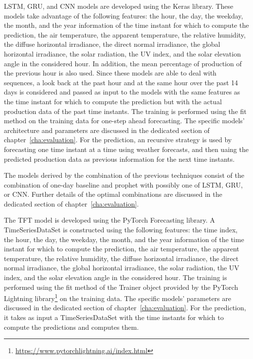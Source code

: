LSTM, GRU, and CNN models are developed using the Keras library.
These models take advantage of the following features: the hour, the day, the weekday, the month, and the year information of the time instant for which to compute the prediction, the air temperature, the apparent temperature, the relative humidity, the diffuse horizontal irradiance, the direct normal irradiance, the global horizontal irradiance, the solar radiation, the UV index, and the solar elevation angle in the considered hour.
In addition, the mean percentage of production of the previous hour is also used.
Since these models are able to deal with sequences, a look back at the past hour and at the same hour over the past 14 days is considered and passed as input to the models with the same features as the time instant for which to compute the prediction but with the actual production data of the past time instants.
The training is performed using the fit method on the training data for one-step ahead forecasting.
The specific models' architecture and parameters are discussed in the dedicated section of chapter~\ref{cha:evaluation}.
For the prediction, an recursive strategy is used by forecasting one time instant at a time using weather forecasts, and then uaing the predicted production data as previous information for the next time instants.

The models derived by the combination of the previous techniques consist of the combination of one-day baseline and prophet with possibly one of LSTM, GRU, or CNN.
Further details of the optimal combinations are discussed in the dedicated section of chapter~\ref{cha:evaluation}.

The TFT model is developed using the PyTorch Forecasting library.
A TimeSeriesDataSet is constructed using the following features: the time index, the hour, the day, the weekday, the month, and the year information of the time instant for which to compute the prediction, the air temperature, the apparent temperature, the relative humidity, the diffuse horizontal irradiance, the direct normal irradiance, the global horizontal irradiance, the solar radiation, the UV index, and the solar elevation angle in the considered hour.
The training is performed using the fit method of the Trainer object provided by the PyTorch Lightning library\footnote{ \url{https://www.pytorchlightning.ai/index.html} } on the training data.
The specific models' parameters are discussed in the dedicated section of chapter~\ref{cha:evaluation}.
For the prediction, it takes as input a TimeSeriesDataSet with the time instants for which to compute the predictions and computes them.

